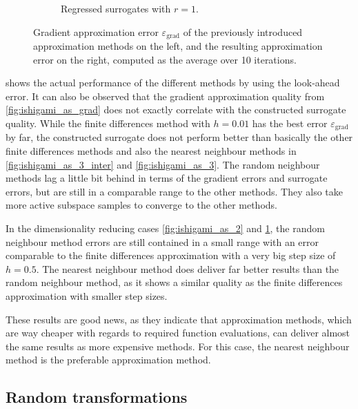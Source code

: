 \documentclass[
  a4paper,  %
  twoside,  %
  bibliography=totoc,
  headsepline,
  cleardoublepage=empty,
  parskip=half,
  draft=false
]{scrbook}
\begin{document}
\begin{mdframed}[style=style]
\begin{figure}[H]
\begin{subfigure}{.5\textwidth}
	\caption{Regressed surrogates with $r=1$.}
	\label{fig:ishigami_as_1}
\end{subfigure}
\delimit
	\caption{Gradient approximation error $\varepsilon_{\text{grad}}$ of the previously introduced approximation methods on the left, and the resulting approximation error on the right, computed as the average over 10 iterations.}
	\label{fig:ishigami_as}
\end{figure}
\end{mdframed}
%
 shows the actual performance of the different methods by using the look-ahead error.
It can also be observed that the gradient approximation quality from \cref{fig:ishigami_as_grad} does not exactly correlate with the constructed surrogate quality.
While the finite differences method with $h=0.01$ has the best error $\varepsilon_{\mathrm{grad}}$ by far, the constructed surrogate does not perform better than basically the other finite differences methods and also the nearest neighbour methods in \cref{fig:ishigami_as_3_inter} and \cref{fig:ishigami_as_3}.
The random neighbour methods lag a little bit behind in terms of the gradient errors and surrogate errors, but are still in a comparable range to the other methods.
They also take more active subspace samples to converge to the other methods.

In the dimensionality reducing cases \cref{fig:ishigami_as_2} and \cref{fig:ishigami_as_1}, the random neighbour method errors are still contained in a small range with an error comparable to the finite differences approximation with a very big step size of $h=0.5$.
The nearest neighbour method does deliver far better results than the random neighbour method, as it shows a similar quality as the finite differences approximation with smaller step sizes.

These results are good news, as they indicate that approximation methods, which are way cheaper with regards to required function evaluations, can deliver almost the same results as more expensive methods.
For this case, the nearest neighbour method is the preferable approximation method.

\subsection{Random transformations}
\end{document}
